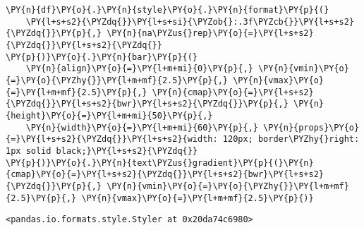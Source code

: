     \begin{tcolorbox}[breakable, size=fbox, boxrule=1pt, pad at break*=1mm,colback=cellbackground, colframe=cellborder]
\begin{Verbatim}[commandchars=\\\{\}]
\PY{n}{df}\PY{o}{.}\PY{n}{style}\PY{o}{.}\PY{n}{format}\PY{p}{(}
    \PY{l+s+s2}{\PYZdq{}}\PY{l+s+si}{\PYZob{}:.3f\PYZcb{}}\PY{l+s+s2}{\PYZdq{}}\PY{p}{,} \PY{n}{na\PYZus{}rep}\PY{o}{=}\PY{l+s+s2}{\PYZdq{}}\PY{l+s+s2}{\PYZdq{}}
\PY{p}{)}\PY{o}{.}\PY{n}{bar}\PY{p}{(}
    \PY{n}{align}\PY{o}{=}\PY{l+m+mi}{0}\PY{p}{,} \PY{n}{vmin}\PY{o}{=}\PY{o}{\PYZhy{}}\PY{l+m+mf}{2.5}\PY{p}{,} \PY{n}{vmax}\PY{o}{=}\PY{l+m+mf}{2.5}\PY{p}{,} \PY{n}{cmap}\PY{o}{=}\PY{l+s+s2}{\PYZdq{}}\PY{l+s+s2}{bwr}\PY{l+s+s2}{\PYZdq{}}\PY{p}{,} \PY{n}{height}\PY{o}{=}\PY{l+m+mi}{50}\PY{p}{,}
    \PY{n}{width}\PY{o}{=}\PY{l+m+mi}{60}\PY{p}{,} \PY{n}{props}\PY{o}{=}\PY{l+s+s2}{\PYZdq{}}\PY{l+s+s2}{width: 120px; border\PYZhy{}right: 1px solid black;}\PY{l+s+s2}{\PYZdq{}}
\PY{p}{)}\PY{o}{.}\PY{n}{text\PYZus{}gradient}\PY{p}{(}\PY{n}{cmap}\PY{o}{=}\PY{l+s+s2}{\PYZdq{}}\PY{l+s+s2}{bwr}\PY{l+s+s2}{\PYZdq{}}\PY{p}{,} \PY{n}{vmin}\PY{o}{=}\PY{o}{\PYZhy{}}\PY{l+m+mf}{2.5}\PY{p}{,} \PY{n}{vmax}\PY{o}{=}\PY{l+m+mf}{2.5}\PY{p}{)}
\end{Verbatim}
\end{tcolorbox}

            \begin{tcolorbox}[breakable, size=fbox, boxrule=.5pt, pad at break*=1mm, opacityfill=0]
\begin{Verbatim}[commandchars=\\\{\}]
<pandas.io.formats.style.Styler at 0x20da74c6980>
\end{Verbatim}
\end{tcolorbox}
